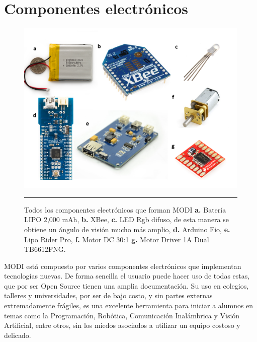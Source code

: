 
\section{Componentes electrónicos}

\begin{figure}[htbp]
	\centering
		\includegraphics[width=\textwidth]{./Figures/MODI/compElo.png}
		\rule{35em}{0.5pt}
	\caption[Componentes Electrónicos]{Todos los componentes electrónicos que forman MODI \textbf{ a.} Batería LIPO 2,000 mAh, \textbf{b.} XBee, \textbf{c.} LED Rgb difuso, de esta manera se obtiene un ángulo de visión mucho más amplio, \textbf{d.} Arduino Fio, \textbf{e.} Lipo Rider Pro,\textbf{ f.} Motor DC 30:1 \textbf{g.} Motor Driver 1A Dual TB6612FNG.}
	\label{fig:compELO}
\end{figure}

MODI está compuesto por varios componentes electrónicos que implementan tecnologías nuevas. De forma sencilla el usuario puede hacer uso de todas estas, que por ser Open Source tienen una amplia documentación. Su uso en colegios, talleres y universidades, por ser de bajo costo, y sin partes externas extremadamente frágiles, es una excelente herramienta para iniciar a alumnos en temas como la Programación, Robótica, Comunicación Inalámbrica y Visión Artificial, entre otros, sin los miedos asociados a utilizar un equipo costoso y delicado.


